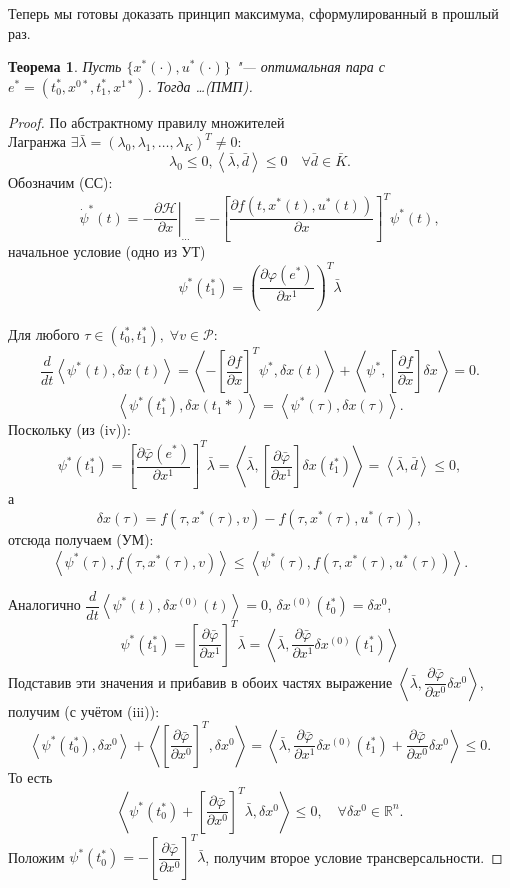 \documentclass[12pt, a4paper]{article}
\theoremstyle{rusdef}
\newtheorem{theorem}{Теорема}
\newcommand{\R}{\ensuremath{\mathbb{R}}} %
\renewcommand{\P}{\mathscr{P}} %
\renewcommand{\H}{\mathcal{H}} %
\renewcommand{\d}{\partial} %
\begin{document}
Теперь мы готовы доказать принцип максимума, сформулированный в прошлый раз.

\begin{theorem}
  Пусть $\{x^*(\cdot), u^*(\cdot)\}$ "--- оптимальная пара с $e^* = (t_0^*, x^{0*}, t_1^*, x^{1*})$. Тогда \ldots (ПМП).
\end{theorem}
\begin{proof}
  По абстрактному правилу множителей\\ Лагранжа $\exists \bar{\lambda} = (\lambda_0, \lambda_1, \ldots, \lambda_K)^T \neq 0 \colon$
  \[
    \lambda_0 \leqslant 0, \left< \bar{\lambda}, \bar{d} \right> \leqslant 0 \quad \forall \bar{d} \in \bar{K}.
  \]
  Обозначим (СС):
  \[
    \dot{\psi}^*(t) = - \left. \dfrac{\d \H}{\d x} \right\vert_{\ldots} = - \left[ \dfrac{\d f(t, x^*(t), u^*(t))}{\d x} \right]^T \psi^*(t),
  \]
  начальное условие (одно из УТ)
  \[
    \psi^*(t_1^*) = \left( \dfrac{\d \varphi(e^*)}{\d x^1} \right)^T \bar{\lambda}
  \]

  Для любого $\tau \in (t_0^*, t_1^*), \; \forall v \in \P\colon$
  \[
    \dfrac{d}{dt} \left< \psi^*(t), \delta x(t) \right> = \left< - \left[\dfrac{\d f}{\d x}\right]^T \psi^* , \delta x(t)\right> + \left<\psi^*, \left[\dfrac{\d f}{\d x}\right] \delta x \right> = 0.
  \]
  \[
    \left< \psi^*(t_1^*), \delta x(t_1*) \right> = \left< \psi^*(\tau), \delta x(\tau) \right>.
  \]
  Поскольку (из (iv)):
  \[
    \psi^*(t_1^*) = \left[ \dfrac{\d \bar{\varphi}(e^*)}{\d x^1} \right]^T \bar{\lambda} = \left< \bar{\lambda}, \left[ \dfrac{\d \bar{\varphi}}{\d x^1} \right] \delta x(t_1^*) \right> = \left<\bar{\lambda}, \bar{d}\right> \leqslant 0,
  \]
  а
  \[
    \delta x(\tau) = f(\tau, x^*(\tau), v) - f(\tau, x^*(\tau), u^*(\tau)),
  \]
  отсюда получаем (УМ):
  \[
    \left< \psi^*(\tau), f(\tau, x^*(\tau), v) \right> \leqslant \left< \psi^*(\tau), f(\tau, x^*(\tau), u^*(\tau)) \right>.
  \]

  Аналогично $\dfrac{d}{dt} \left< \psi^*(t), \delta x^{(0)}(t) \right> = 0$, $\delta x^{(0)}(t_0^*) = \delta x^0$,
  \[
    \psi^*(t_1^*) = \left[\dfrac{\d \bar{\varphi}}{\d x^1}\right]^T \bar{\lambda} = \left<\bar{\lambda}, \dfrac{\d \bar{\varphi}}{\d x^1} \delta x^{(0)}(t_1^*) \right>
  \]
  Подставив эти значения и прибавив в обоих частях выражение $\left< \bar{\lambda}, \dfrac{\d \bar{\varphi}}{\d x^0} \delta x^0 \right>$, получим (с учётом (iii)):
  \[
    \left< \psi^*(t_0^*), \delta x^0 \right> + \left< \left[\dfrac{\d \bar{\varphi}}{\d x^0}\right]^T ,\delta x^0 \right> = \left< \bar{\lambda}, \dfrac{\d \bar{\varphi}}{\d x^1} \delta x^{(0)}(t_1^*) + \dfrac{\d \bar{\varphi}}{\d x^0} \delta x^0 \right> \!\leqslant\! 0.
  \]
  То есть
  \[
    \left< \psi^*(t_0^*) + \left[\dfrac{\d \bar{\varphi}}{\d x^0}\right]^T \bar{\lambda}, \delta x^0 \right> \leqslant 0, \quad \forall \delta x^0 \in \R^n.
  \]
  Положим $\psi^*(t_0^*) = -\left[\dfrac{\d \bar{\varphi}}{\d x^0}\right]^T \bar{\lambda}$, получим второе условие трансверсальности.


\end{proof}
\end{document}

